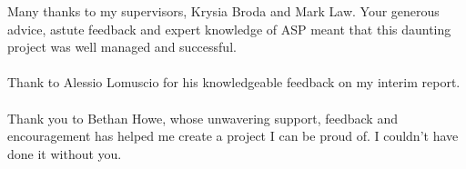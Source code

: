 \let\cleardoublepage\clearpage
{}

\begin{acknowledgements}
Many thanks to my supervisors, Krysia Broda and Mark Law. Your generous advice, astute feedback and expert knowledge of ASP meant that this daunting project was well managed and successful. \\ \\
Thank to Alessio Lomuscio for his knowledgeable feedback on my interim report. \\ \\
Thank you to Bethan Howe, whose unwavering support, feedback and encouragement has helped me create a project I can be proud of. I couldn't have done it without you.

\end{acknowledgements}